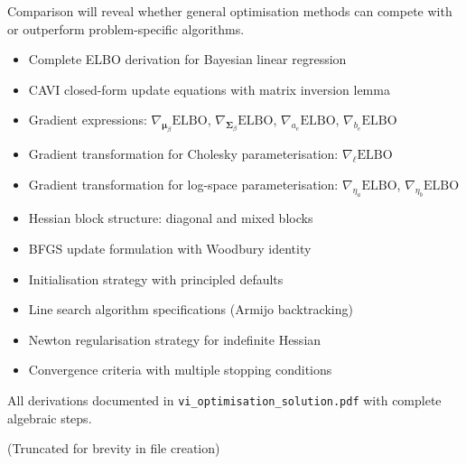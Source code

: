 \documentclass[11pt]{article}
\newcommand{\ELBO}{\text{ELBO}}
\begin{document}
Comparison will reveal whether general optimisation methods can compete with or outperform problem-specific algorithms.

\begin{itemize}
\item[\checkmark] Complete ELBO derivation for Bayesian linear regression
\item[\checkmark] CAVI closed-form update equations with matrix inversion lemma
\item[\checkmark] Gradient expressions: $\nabla_{\bm{\mu}_\beta} \ELBO$, $\nabla_{\bm{\Sigma}_\beta} \ELBO$, $\nabla_{a_e} \ELBO$, $\nabla_{b_e} \ELBO$
\item[\checkmark] Gradient transformation for Cholesky parameterisation: $\nabla_{\bm{\ell}} \ELBO$
\item[\checkmark] Gradient transformation for log-space parameterisation: $\nabla_{\eta_a} \ELBO$, $\nabla_{\eta_b} \ELBO$
\item[\checkmark] Hessian block structure: diagonal and mixed blocks
\item[\checkmark] BFGS update formulation with Woodbury identity
\item[\checkmark] Initialisation strategy with principled defaults
\item[\checkmark] Line search algorithm specifications (Armijo backtracking)
\item[\checkmark] Newton regularisation strategy for indefinite Hessian
\item[\checkmark] Convergence criteria with multiple stopping conditions
\end{itemize}

All derivations documented in \texttt{vi\_optimisation\_solution.pdf} with complete algebraic steps.

(Truncated for brevity in file creation)
\end{document}
